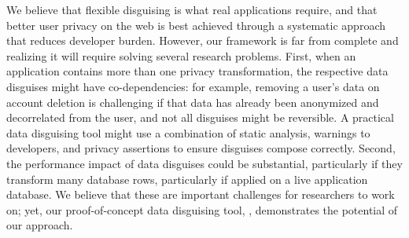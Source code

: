 %
We believe that flexible disguising is what real applications require, and that better user
privacy on the web is best achieved through a systematic approach that reduces developer
burden.
%
However, our framework is far from complete and realizing it will require solving several
research problems.
%
First, when an application contains more than one privacy transformation, the respective
data disguises might have co-dependencies: for example, removing a user's data on account
deletion is challenging if that data has already been anonymized and decorrelated from the
user, and not all disguises might be reversible.
%
A practical data disguising tool might use a combination of static analysis, warnings to
developers, and privacy assertions to ensure disguises compose correctly.
%
Second, the performance impact of data disguises could be substantial, particularly if they
transform many database rows, particularly if applied on a live application database.
%
We believe that these are important challenges for researchers to work on; yet,
%
%
%
%
our proof-of-concept data disguising tool, \sys, demonstrates the potential of our approach.
%
%
